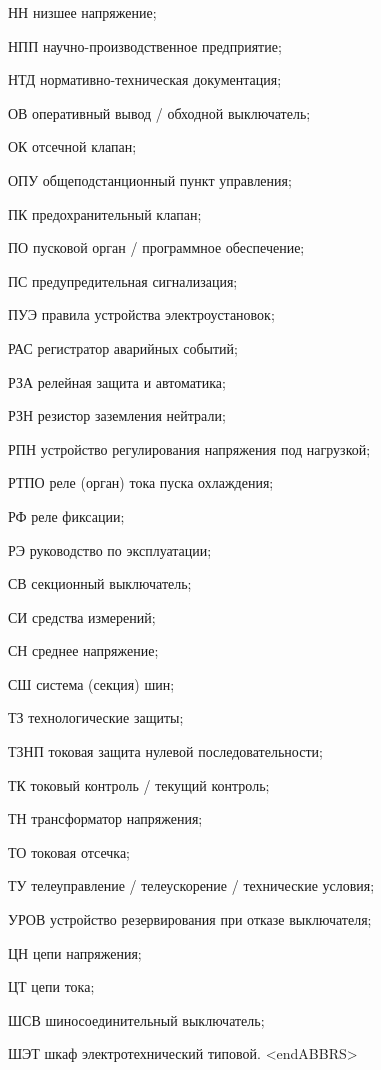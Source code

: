 \begin{list}{}
\item[НН] низшее напряжение;
\item[НПП] научно-производственное предприятие;
\item[НТД] нормативно-техническая документация;
\item[ОВ] оперативный вывод / обходной выключатель;
\item[ОК] отсечной клапан;
\item[ОПУ] общеподстанционный пункт управления;
\item[ПК] предохранительный клапан;
\item[ПО] пусковой орган / программное обеспечение;
\item[ПС] предупредительная сигнализация;
\item[ПУЭ] правила устройства электроустановок;
\item[РАС] регистратор аварийных событий;
\item[РЗА] релейная защита и автоматика;
\item[РЗН] резистор заземления нейтрали;
\item[РПН] устройство регулирования напряжения под нагрузкой;
\item[РТПО] реле (орган) тока пуска охлаждения;
\item[РФ] реле фиксации;
\item[РЭ] руководство по эксплуатации;
\item[СВ] секционный выключатель;
\item[СИ] средства измерений;
\item[СН] среднее напряжение;
\item[СШ] система (секция) шин;
\item[ТЗ] технологические защиты;
\item[ТЗНП] токовая защита нулевой последовательности;
\item[ТК] токовый контроль / текущий контроль;
\item[ТН] трансформатор напряжения;
\item[ТО] токовая отсечка;
\item[ТУ] телеуправление / телеускорение / технические условия;
\item[УРОВ] устройство резервирования при отказе выключателя;
\item[ЦН] цепи напряжения;
\item[ЦТ] цепи тока;
\item[ШСВ] шиносоединительный выключатель;
\item[ШЭТ] шкаф электротехнический типовой.
{\color{white}\fontsize{0.1pt}{0.1pt}\selectfont<endABBRS>}
\end{list}
